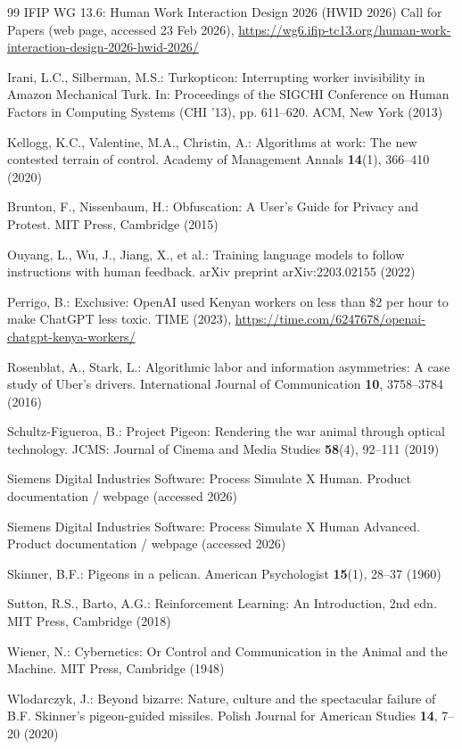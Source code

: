 \documentclass[runningheads]{llncs}
\begin{document}
\begin{thebibliography}{99}
IFIP WG 13.6: Human Work Interaction Design 2026 (HWID 2026) Call for Papers (web page, accessed 23 Feb 2026), \url{https://wg6.ifip-tc13.org/human-work-interaction-design-2026-hwid-2026/}

Irani, L.C., Silberman, M.S.: Turkopticon: Interrupting worker invisibility in Amazon Mechanical Turk. In: Proceedings of the SIGCHI Conference on Human Factors in Computing Systems (CHI '13), pp. 611--620. ACM, New York (2013)

Kellogg, K.C., Valentine, M.A., Christin, A.: Algorithms at work: The new contested terrain of control. Academy of Management Annals \textbf{14}(1), 366--410 (2020)

Brunton, F., Nissenbaum, H.: Obfuscation: A User's Guide for Privacy and Protest. MIT Press, Cambridge (2015)

Ouyang, L., Wu, J., Jiang, X., et al.: Training language models to follow instructions with human feedback. arXiv preprint arXiv:2203.02155 (2022)

Perrigo, B.: Exclusive: OpenAI used Kenyan workers on less than \$2 per hour to make ChatGPT less toxic. TIME (2023), \url{https://time.com/6247678/openai-chatgpt-kenya-workers/}

Rosenblat, A., Stark, L.: Algorithmic labor and information asymmetries: A case study of Uber's drivers. International Journal of Communication \textbf{10}, 3758--3784 (2016)

Schultz-Figueroa, B.: Project Pigeon: Rendering the war animal through optical technology. JCMS: Journal of Cinema and Media Studies \textbf{58}(4), 92--111 (2019)

Siemens Digital Industries Software: Process Simulate X Human. Product documentation / webpage (accessed 2026)

Siemens Digital Industries Software: Process Simulate X Human Advanced. Product documentation / webpage (accessed 2026)

Skinner, B.F.: Pigeons in a pelican. American Psychologist \textbf{15}(1), 28--37 (1960)

Sutton, R.S., Barto, A.G.: Reinforcement Learning: An Introduction, 2nd edn. MIT Press, Cambridge (2018)

Wiener, N.: Cybernetics: Or Control and Communication in the Animal and the Machine. MIT Press, Cambridge (1948)

Wlodarczyk, J.: Beyond bizarre: Nature, culture and the spectacular failure of B.F. Skinner's pigeon-guided missiles. Polish Journal for American Studies \textbf{14}, 7--20 (2020)

\end{thebibliography}
\end{document}
